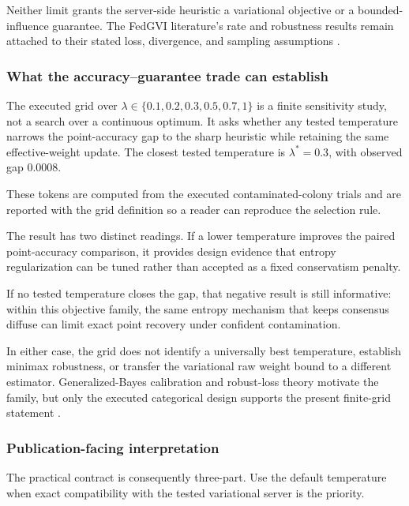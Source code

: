 \documentclass[
  english,
]{article}
\theoremstyle{plain}
\theoremstyle{definition}
\theoremstyle{remark}
\theoremstyle{definition}
\begin{document}
Neither limit grants the server-side 
heuristic a variational objective or a bounded-influence guarantee. The
FedGVI literature's rate and robustness results remain attached to their
stated loss, divergence, and sampling assumptions
\citep{mildner2025fedgvi, mildner2025rates}.

\subsubsection{What the accuracy--guarantee trade can
establish}\label{sec:formalism-tempered-evidence}

The executed grid over \(\lambda\in\{0.1, 0.2, 0.3, 0.5, 0.7, 1\}\) is a
finite sensitivity study, not a search over a continuous optimum. It
asks whether any tested temperature narrows the point-accuracy gap to
the sharp heuristic while retaining the same effective-weight update.
The closest tested temperature is \(\lambda^{\ast}=0.3\), with observed
gap \(0.0008\).

These tokens are computed from the executed contaminated-colony trials
and are reported with the grid definition so a reader can reproduce the
selection rule.

The result has two distinct readings. If a lower temperature improves
the paired point-accuracy comparison, it provides design evidence that
entropy regularization can be tuned rather than accepted as a fixed
conservatism penalty.

If no tested temperature closes the gap, that negative result is still
informative: within this objective family, the same entropy mechanism
that keeps consensus diffuse can limit exact point recovery under
confident contamination.

In either case, the grid does not identify a universally best
temperature, establish minimax robustness, or transfer the variational
raw weight bound to a different estimator. Generalized-Bayes calibration
and robust-loss theory motivate the family, but only the executed
categorical design supports the present finite-grid statement
\citep{bissiri2016general, knoblauch2022generalized, mildner2025fedgvi}.

\subsubsection{Publication-facing
interpretation}\label{sec:formalism-tempered-interpretation-summary}

The practical contract is consequently three-part. Use the default
temperature when exact compatibility with the tested variational server
is the priority.
\end{document}
